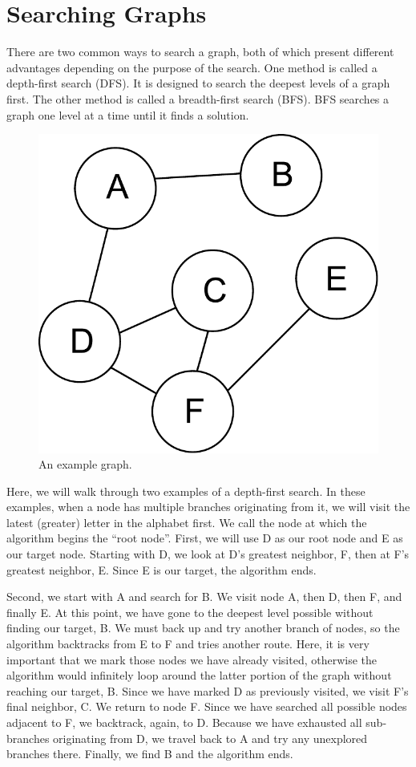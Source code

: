 \section*{Searching Graphs}
There are two common ways to search a graph, both of which present different advantages depending on the purpose of the search.
One method is called a depth-first search (DFS).  It is designed to search the deepest levels of a graph first.
The other method is called a breadth-first search (BFS).  BFS searches a graph one level at a time until it finds a solution.
\begin{figure}[h]
\centering
\includegraphics[width=.5\textwidth]{graph.pdf}
\caption{An example graph.}
\label{fig:bfs_dfs_graph}
\end{figure}


Here, we will walk through two examples of a depth-first search.
In these examples, when a node has multiple branches originating from it,
we will visit the latest (greater) letter in the alphabet first.
We call the node at which the algorithm begins the ``root node''.
First, we will use D as our root node and E as our target node.
Starting with D, we look at D's greatest neighbor, F, then at F's greatest
neighbor, E. Since E is our target, the algorithm ends.

Second, we start with A and search for B.
We visit node A, then D, then F, and finally E.
At this point, we have gone to the deepest level possible without finding our target, B.
We must back up and try another branch of nodes, so
the algorithm backtracks from E to F and tries another route.
Here, it is very important that we mark those nodes we have already visited,
otherwise the algorithm would infinitely loop around the latter portion of
the graph without reaching our target, B. Since we have marked D as previously visited, we visit F's final neighbor, C.
We return to node F. Since we have
searched all possible nodes adjacent to F, we backtrack, again, to D. Because we have
exhausted all sub-branches originating from D, we travel back to A and try
any unexplored branches there. Finally, we find B and the algorithm ends.

